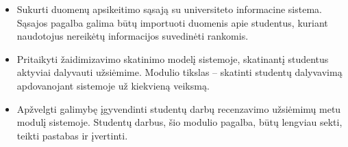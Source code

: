 \documentclass{VUMIFPSbakalaurinis}
\begin{document}

\begin{itemize}
	\item Sukurti duomenų apsikeitimo sąsają su universiteto informacine sistema. Sąsajos pagalba galima būtų importuoti duomenis apie studentus, kuriant naudotojus nereikėtų informacijos suvedinėti rankomis.
	\item Pritaikyti žaidimizavimo skatinimo modelį sistemoje, skatinantį studentus aktyviai dalyvauti užsiėmime. Modulio tikslas – skatinti studentų dalyvavimą apdovanojant sistemoje už kiekvieną veiksmą.
	\item Apžvelgti galimybę įgyvendinti studentų darbų recenzavimo užsiėmimų metu modulį sistemoje. Studentų darbus, šio modulio pagalba, būtų lengviau sekti, teikti pastabas ir įvertinti. 
\end{itemize}

\printbibliography[heading=bibintoc]  %


\end{document}
